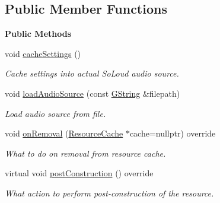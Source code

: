 \subsection*{Public Member Functions}
\begin{Indent}\textbf{ Public Methods}\par
\begin{DoxyCompactItemize}
\item 
\mbox{\label{classrev_1_1_audio_resource_a32fdcb6cac96ff61344d0558db37c786}} 
void \mbox{\hyperlink{classrev_1_1_audio_resource_a32fdcb6cac96ff61344d0558db37c786}{cache\+Settings}} ()
\begin{DoxyCompactList}\small\item\em Cache settings into actual So\+Loud audio source. \end{DoxyCompactList}\item 
\mbox{\label{classrev_1_1_audio_resource_a2fe9a47cb5df37e4cede18c1f0466fe9}} 
void \mbox{\hyperlink{classrev_1_1_audio_resource_a2fe9a47cb5df37e4cede18c1f0466fe9}{load\+Audio\+Source}} (const \mbox{\hyperlink{classrev_1_1_g_string}{G\+String}} \&filepath)
\begin{DoxyCompactList}\small\item\em Load audio source from file. \end{DoxyCompactList}\item 
\mbox{\label{classrev_1_1_audio_resource_af4a0194124df44aa159839bd01cfc782}} 
void \mbox{\hyperlink{classrev_1_1_audio_resource_af4a0194124df44aa159839bd01cfc782}{on\+Removal}} (\mbox{\hyperlink{classrev_1_1_resource_cache}{Resource\+Cache}} $\ast$cache=nullptr) override
\begin{DoxyCompactList}\small\item\em What to do on removal from resource cache. \end{DoxyCompactList}\item 
virtual void \mbox{\hyperlink{classrev_1_1_audio_resource_a485cda6016a1dc52310239fb6c58e8cd}{post\+Construction}} () override
\begin{DoxyCompactList}\small\item\em What action to perform post-\/construction of the resource. \end{DoxyCompactList}\end{DoxyCompactItemize}
\end{Indent}
